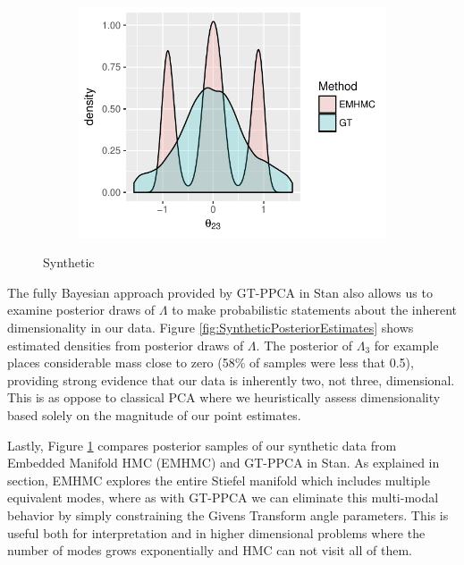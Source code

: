 \documentclass{article}
\begin{document}
\begin{figure}
    ~ %
    \begin{subfigure}[b]{0.3\textwidth}
        \includegraphics[width=\textwidth]{multiModal.pdf}
        \caption{}
        \label{fig:multiModal}
    \end{subfigure}
    \caption{Synthetic}\label{fig:synthetic}
\end{figure}

The fully Bayesian approach provided by GT-PPCA in Stan also allows us to examine posterior draws of $\Lambda$ to make probabilistic statements about the inherent dimensionality in our data. Figure \ref{fig:SyntheticPosteriorEstimates} shows estimated densities from posterior draws of $\Lambda$. The posterior of $\Lambda_3$ for example places considerable mass close to zero (58\% of samples were less that 0.5), providing strong evidence that our data is inherently two, not three, dimensional. This is as oppose to classical PCA where we heuristically assess dimensionality based solely on the magnitude of our point estimates.

Lastly, Figure \ref{fig:multiModal} compares posterior samples of our synthetic data from Embedded Manifold HMC (EMHMC) and GT-PPCA in Stan. As explained in section, EMHMC explores the entire Stiefel manifold which includes multiple equivalent modes, where as with GT-PPCA we can eliminate this multi-modal behavior by simply constraining the Givens Transform angle parameters. This is useful both for interpretation and in higher dimensional problems where the number of modes grows exponentially and HMC can not visit all of them. 
\end{document}
